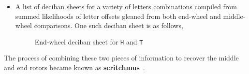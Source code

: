 \begin{itemize}
  \item A list of deciban sheets for a variety of letters
    combinations compiled from summed likelihoods of letter offsets
    gleaned from both end-wheel and middle-wheel comparisons. One
    such deciban sheet is as follows,
    \begin{figure}[H]
      \begin{center}
      \end{center}

      \caption{End-wheel deciban sheet for \texttt{H} and \texttt{T}~\cite[p.~101]{Alexander1945}}
      \label{fig:deciban_sheet}
    \end{figure}
\end{itemize}
The process of combining these two pieces of information to recover
the middle and end rotors became known as {\bf{scritchmus}}~\cite[Section~7.0]{Hosgood2007}.

